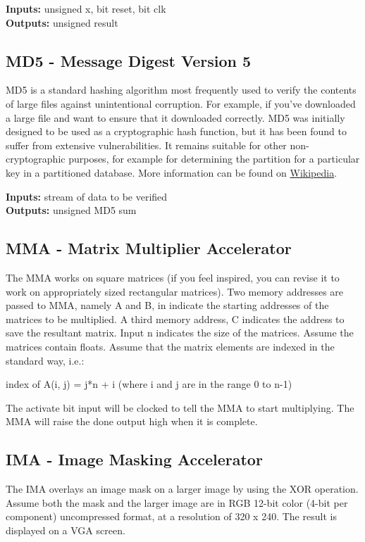 \textbf{Inputs:} unsigned x, bit reset, bit clk\\
\textbf{Outputs:} unsigned result

\subsection{MD5 - Message Digest Version 5}
MD5 is a standard hashing algorithm most frequently used to verify the contents of large files against unintentional corruption. For example, if you've downloaded a large file and want to ensure that it downloaded correctly.  MD5 was initially designed to be used as a cryptographic hash function, but it has been found to suffer from extensive vulnerabilities. It remains suitable for other non-cryptographic purposes, for example for determining the partition for a particular key in a partitioned database. More information can be found on \href{https://en.wikipedia.org/wiki/MD5}{Wikipedia}.

\textbf{Inputs:} stream of data to be verified\\
\textbf{Outputs:} unsigned MD5 sum

\subsection{MMA - Matrix Multiplier Accelerator}
The MMA works on square matrices (if you feel inspired, you can revise it to work on appropriately sized rectangular matrices). Two memory addresses are passed to MMA, namely A and B, in indicate the starting addresses of the matrices to be multiplied. A third memory address, C indicates the address to save the resultant matrix. Input n indicates the size of the matrices. Assume the matrices contain floats. Assume that the matrix elements are indexed in the standard way, i.e.:

index of A(i, j) = j*n + i (where i and j are in the range 0 to n-1)

The activate bit input will be clocked to tell the MMA to start multiplying. The MMA will raise the done output high when it is complete.

\subsection{IMA - Image Masking Accelerator}
The IMA overlays an image mask on a larger image by using the XOR operation. Assume both the mask and the larger image are in RGB 12-bit color (4-bit per component) uncompressed format, at a resolution of 320 x 240. The result is displayed on a VGA screen.

